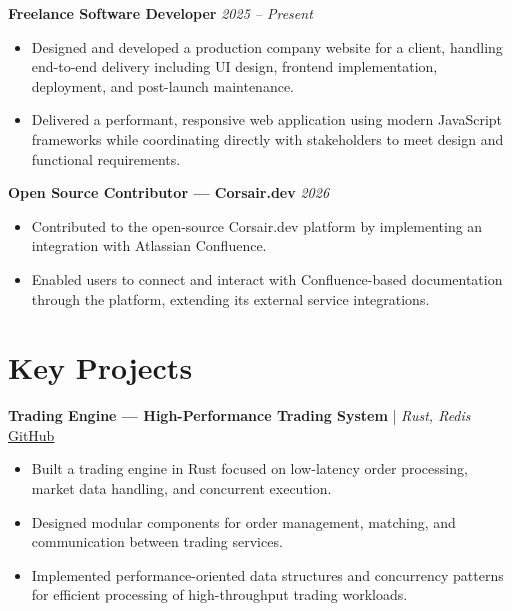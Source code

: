 \documentclass[a4paper,10pt]{article}
\begin{document}
\textbf{Freelance Software Developer} \hfill \textit{2025 -- Present}

\begin{itemize}
    \item Designed and developed a production company website for a client, handling end-to-end delivery including UI design, frontend implementation, deployment, and post-launch maintenance.
    \item Delivered a performant, responsive web application using modern JavaScript frameworks while coordinating directly with stakeholders to meet design and functional requirements.
\end{itemize}

\vspace{2pt}

\textbf{Open Source Contributor --- Corsair.dev} \hfill \textit{2026}

\begin{itemize}
    \item Contributed to the open-source Corsair.dev platform by implementing an integration with Atlassian Confluence.
    \item Enabled users to connect and interact with Confluence-based documentation through the platform, extending its external service integrations.
\end{itemize}

\section*{Key Projects}

\textbf{Trading Engine --- High-Performance Trading System} | \textit{Rust, Redis}
\quad \href{https://github.com/rishabh1244/trading-system/}{GitHub}

\begin{itemize}
    \item Built a trading engine in Rust focused on low-latency order processing, market data handling, and concurrent execution.
    \item Designed modular components for order management, matching, and communication between trading services.
    \item Implemented performance-oriented data structures and concurrency patterns for efficient processing of high-throughput trading workloads.
\end{itemize}

\vspace{2pt}
\end{document}
